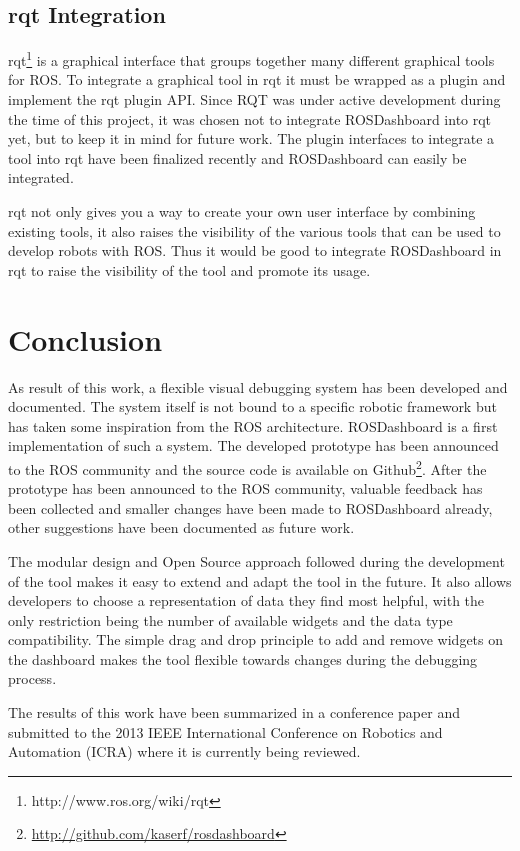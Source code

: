 \subsection{rqt Integration}

rqt\footnote{http://www.ros.org/wiki/rqt} is a graphical interface that groups together many different graphical tools for ROS. To integrate a graphical tool in rqt it must be wrapped as a plugin and implement the rqt plugin API.
Since RQT was under active development during the time of this project, it was chosen not to integrate ROSDashboard into rqt yet, but to keep it in mind for future work. The plugin interfaces to integrate a tool into rqt have been finalized recently and ROSDashboard can easily be integrated.

rqt not only gives you a way to create your own user interface by combining existing tools, it also raises the visibility of the various tools that can be used to develop robots with ROS. Thus it would be good to integrate ROSDashboard in rqt to raise the visibility of the tool and promote its usage.

\section{Conclusion}

As result of this work, a flexible visual debugging system has been developed and documented. The system itself is not bound to a specific robotic framework but has taken some inspiration from the ROS architecture. ROSDashboard is a first implementation of such a system. The developed prototype has been announced to the ROS community and the source code is available on Github\footnote{\url{http://github.com/kaserf/rosdashboard}}. After the prototype has been announced to the ROS community, valuable feedback has been collected and smaller changes have been made to ROSDashboard already, other suggestions have been documented as future work.

The modular design and Open Source approach followed during the development of the tool makes it easy to extend and adapt the tool in the future. It also allows developers to choose a representation of data they find most helpful, with the only restriction being the number of available widgets and the data type compatibility. The simple drag and drop principle to add and remove widgets on the dashboard makes the tool flexible towards changes during the debugging process.


The results of this work have been summarized in a conference paper and submitted to the 2013 IEEE International Conference on Robotics and Automation (ICRA) where it is currently being reviewed.
